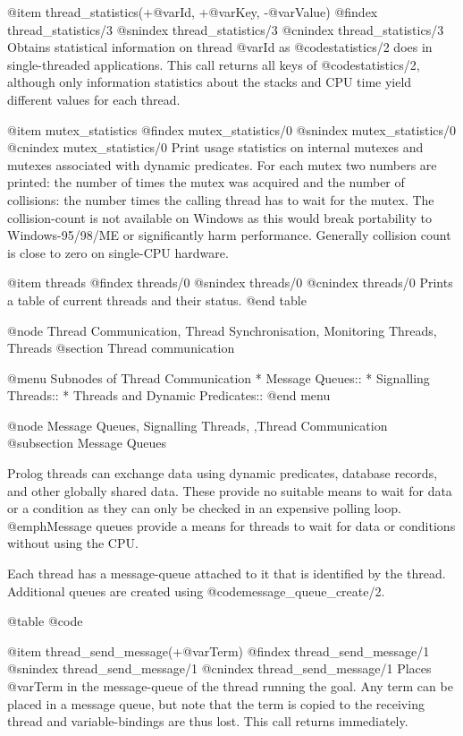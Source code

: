 {{{{{{{{{@item thread_statistics(+@var{Id}, +@var{Key}, -@var{Value})
@findex thread_statistics/3
@snindex thread_statistics/3
@cnindex thread_statistics/3
Obtains statistical information on thread @var{Id} as @code{statistics/2}
does in single-threaded applications.  This call returns all keys
of @code{statistics/2}, although only information statistics about the
stacks and CPU time yield different values for each thread.

@item mutex_statistics
@findex mutex_statistics/0
@snindex mutex_statistics/0
@cnindex mutex_statistics/0
Print usage statistics on internal mutexes and mutexes associated
with dynamic predicates.  For each mutex two numbers are printed:
the number of times the mutex was acquired and the number of
collisions: the number times the calling thread has to
wait for the mutex.  The collision-count is not available on
Windows as this would break portability to Windows-95/98/ME or
significantly harm performance.  Generally collision count is
close to zero on single-CPU hardware.

@item threads
@findex threads/0
@snindex threads/0
@cnindex threads/0
Prints a table of current threads and their status.
@end table


@node Thread Communication, Thread Synchronisation, Monitoring Threads, Threads
@section Thread communication

@menu
Subnodes of Thread Communication
* Message Queues::
* Signalling Threads::            
* Threads and Dynamic Predicates::   
@end menu

@node Message Queues, Signalling Threads, ,Thread Communication
@subsection Message Queues

Prolog threads can exchange data using dynamic predicates, database
records, and other globally shared data. These provide no suitable means
to wait for data or a condition as they can only be checked in an
expensive polling loop. @emph{Message queues} provide a means for
threads to wait for data or conditions without using the CPU.

Each thread has a message-queue attached to it that is identified
by the thread. Additional queues are created using
@code{message_queue_create/2}.

@table @code

@item thread_send_message(+@var{Term})
@findex thread_send_message/1
@snindex thread_send_message/1
@cnindex thread_send_message/1
Places @var{Term} in the message-queue of the thread running the goal. 
Any term can be placed in a message queue, but note that the term is 
copied to the receiving thread and variable-bindings are thus lost. 
This call returns immediately.

}}}}}}}}}
